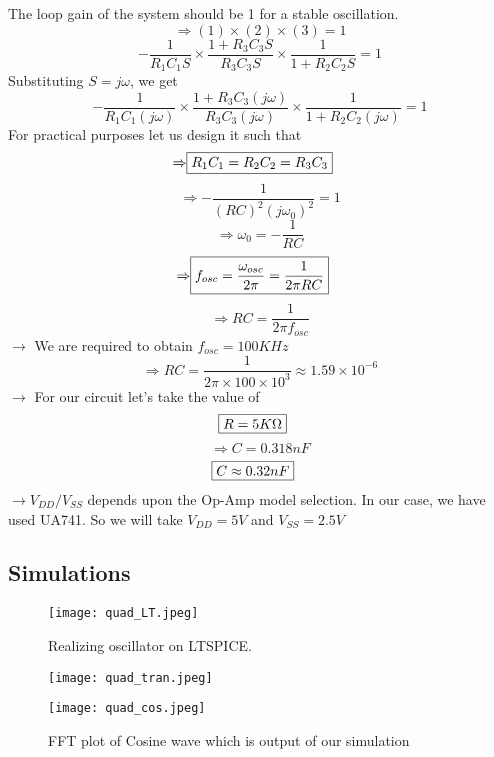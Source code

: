 \documentclass[conference]{IEEEtran}
\begin{document}
\begin{itemize}
    The loop gain of the system should be 1 for a stable oscillation.
    $$\Rightarrow (1)\times(2)\times(3)=1$$
    $$-\frac{1}{R_1C_1S}\times\frac{1+R_3C_3S}{R_3C_3S}\times\frac{1}{1+R_2C_2S}=1$$
    Substituting $S=j\omega$, we get
    $$-\frac{1}{R_1C_1(j\omega)}\times\frac{1+R_3C_3(j\omega)}{R_3C_3(j\omega)}\times\frac{1}{1+R_2C_2(j\omega)}=1$$
    For practical purposes let us design it such that
    \begin{align}
    \Rightarrow\Aboxed {R_1C_1=R_2C_2=R_3C_3}
    \end{align}
    $$\Rightarrow-\frac{1}{(RC)^2(j\omega_0)^2}=1$$
    $$\Rightarrow\omega_0=-\frac{1}{RC}$$
    \begin{align}
    \Rightarrow\Aboxed{f_{osc}=\frac{\omega_{osc}}{2\pi}=\frac{1}{2\pi RC}}   
    \end{align}
    $$\Rightarrow RC=\frac{1}{2\pi f_{osc}}$$
    $\rightarrow$ We are required to obtain $f_{osc}= 100KHz$
    $$\Rightarrow RC=\frac{1}{2\pi\times100\times10^3} \approx 1.59\times10^{-6}$$
     $\rightarrow$ For our circuit let's take the value of 
     \begin{align}
     \Aboxed {R=5K\Omega}
     \end{align}
     $$\Rightarrow C= 0.318nF$$
     \begin{align}
     \Aboxed {C\approx0.32nF}
     \end{align}
     $\rightarrow V_{DD}/V_{SS}$ depends upon the Op-Amp model selection. In our case, we have used UA741. So we will take $V_{DD} = 5V$ and $V_{SS}=2.5V$
    
\end{itemize}

\subsection{Simulations}
\begin{figure}[H]
\centering
\texttt{[image: quad\_LT.jpeg]}
\caption{Realizing oscillator on LTSPICE.}
\end{figure}

\begin{figure}[H]
\centering
\texttt{[image: quad\_tran.jpeg]}
\caption{}
\end{figure}

\begin{figure}[H]
\centering
\texttt{[image: quad\_cos.jpeg]}
\caption{FFT plot of Cosine wave which is output of our simulation}
\end{figure}
\end{document}
